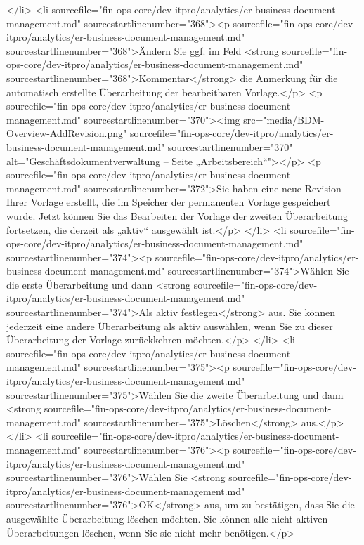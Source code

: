 </li>
<li sourcefile="fin-ops-core/dev-itpro/analytics/er-business-document-management.md" sourcestartlinenumber="368"><p sourcefile="fin-ops-core/dev-itpro/analytics/er-business-document-management.md" sourcestartlinenumber="368">Ändern Sie ggf. im Feld <strong sourcefile="fin-ops-core/dev-itpro/analytics/er-business-document-management.md" sourcestartlinenumber="368">Kommentar</strong> die Anmerkung für die automatisch erstellte Überarbeitung der bearbeitbaren Vorlage.</p>
<p sourcefile="fin-ops-core/dev-itpro/analytics/er-business-document-management.md" sourcestartlinenumber="370"><img src="media/BDM-Overview-AddRevision.png" sourcefile="fin-ops-core/dev-itpro/analytics/er-business-document-management.md" sourcestartlinenumber="370" alt="Geschäftsdokumentverwaltung – Seite „Arbeitsbereich“"></p>
<p sourcefile="fin-ops-core/dev-itpro/analytics/er-business-document-management.md" sourcestartlinenumber="372">Sie haben eine neue Revision Ihrer Vorlage erstellt, die im Speicher der permanenten Vorlage gespeichert wurde. Jetzt können Sie das Bearbeiten der Vorlage der zweiten Überarbeitung fortsetzen, die derzeit als „aktiv“ ausgewählt ist.</p>
</li>
<li sourcefile="fin-ops-core/dev-itpro/analytics/er-business-document-management.md" sourcestartlinenumber="374"><p sourcefile="fin-ops-core/dev-itpro/analytics/er-business-document-management.md" sourcestartlinenumber="374">Wählen Sie die erste Überarbeitung und dann <strong sourcefile="fin-ops-core/dev-itpro/analytics/er-business-document-management.md" sourcestartlinenumber="374">Als aktiv festlegen</strong> aus. Sie können jederzeit eine andere Überarbeitung als aktiv auswählen, wenn Sie zu dieser Überarbeitung der Vorlage zurückkehren möchten.</p>
</li>
<li sourcefile="fin-ops-core/dev-itpro/analytics/er-business-document-management.md" sourcestartlinenumber="375"><p sourcefile="fin-ops-core/dev-itpro/analytics/er-business-document-management.md" sourcestartlinenumber="375">Wählen Sie die zweite Überarbeitung und dann <strong sourcefile="fin-ops-core/dev-itpro/analytics/er-business-document-management.md" sourcestartlinenumber="375">Löschen</strong> aus.</p>
</li>
<li sourcefile="fin-ops-core/dev-itpro/analytics/er-business-document-management.md" sourcestartlinenumber="376"><p sourcefile="fin-ops-core/dev-itpro/analytics/er-business-document-management.md" sourcestartlinenumber="376">Wählen Sie <strong sourcefile="fin-ops-core/dev-itpro/analytics/er-business-document-management.md" sourcestartlinenumber="376">OK</strong> aus, um zu bestätigen, dass Sie die ausgewählte Überarbeitung löschen möchten. Sie können alle nicht-aktiven Überarbeitungen löschen, wenn Sie sie nicht mehr benötigen.</p>
